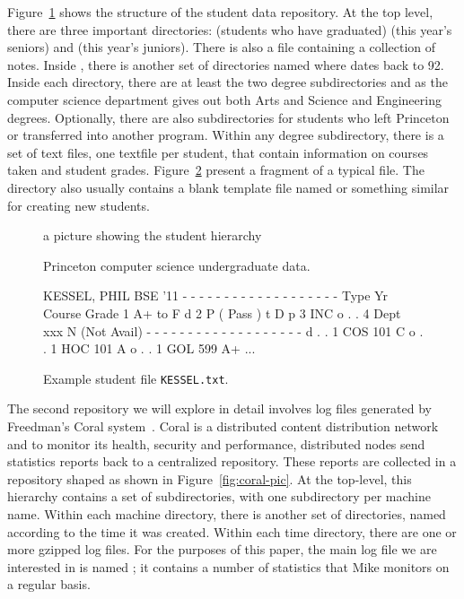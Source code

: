 \documentclass[natbib]{sigplanconf}
\begin{document}
Figure~\ref{fig:student-pic} shows the
structure of the student data repository.  At the top level, there are
three important directories:  (students who have graduated)
 (this year's seniors) and  (this year's juniors).
There is also a  file containing a collection of notes.
Inside , there is another set of directories named 
 where  dates back to 92.  Inside each  
directory, there are at least the 
two degree subdirectories  and  as
the computer science department gives out both Arts and Science
and Engineering degrees.  Optionally, there are also subdirectories for
students who left Princeton or transferred into another program. 
Within any degree subdirectory, there is a set of text files, one
textfile per student, that contain information on courses taken and
student grades.  Figure~\ref{fig:student-file-example} present a fragment
of a typical file.  The directory also usually contains a blank template file
named  or something similar for creating new students.

\begin{figure}

a picture showing the student hierarchy

\caption{Princeton computer science undergraduate data.}
\label{fig:student-pic}
\end{figure}

\begin{figure}
\begin{code}
KESSEL, PHIL	   BSE   '11
- - - - - - - - - - - - - - - - - - -
Type    Yr  Course     Grade
         1             A+ to F
d        2             P  (  Pass )
t  D  p  3             INC
o  .  .  4  Dept  xxx  N  (Not Avail)
- - - - - - - - - - - - - - - - - - -
d  .  .  1  COS   101  C
o  .  .  1  HOC   101  A
o  .  .  1  GOL   599  A+
...
\end{code}
\caption{Example student file {\tt KESSEL.txt}.}
\label{fig:student-file-example}
\end{figure}

The second repository we will explore in detail involves
log files generated by Freedman's Coral system~\cite{freedman+:coral,freedman:coral-experience}.  Coral is a distributed content distribution network and
to monitor its health, security and performance, distributed nodes send
statistics reports back to a centralized repository.  These reports
are collected in a repository shaped as shown in Figure~\ref{fig:coral-pic}.
At the top-level, this hierarchy contains a set of subdirectories, with
one subdirectory per machine name.  Within each machine directory, there is 
another set of directories, named according to the time it was created.
Within each time directory, there are one or more gzipped log files.
For the purposes of this paper, the main log file we are interested 
in is named ; it contains a number of statistics
that Mike monitors on a regular basis. 
\end{document}
